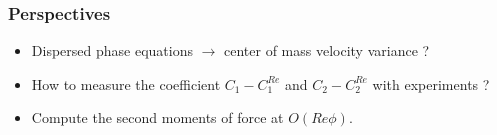 \documentclass{sintefbeamer}
\begin{document}
\begin{frame}
  \frametitle{Perspectives }

  \begin{itemize}
    \item Dispersed phase equations $\to$ center of mass velocity variance ?
    \item How to measure the coefficient $C_1-C_1^{Re}$ and $C_2-C_2^{Re}$ with experiments  ?
    \item Compute the second moments of force at $O(Re \phi)$. 
  \end{itemize}


\centering
\end{frame}


\backmatter

\begin{frame}
 \footnotesize

 

\end{frame}
\end{document}
